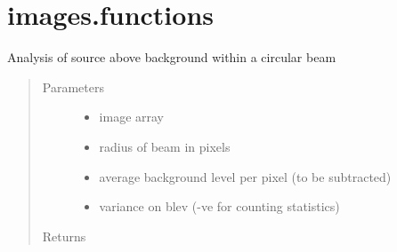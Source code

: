 \documentclass[letterpaper,10pt,english]{sphinxmanual}
\begin{document}
\section{images.functions}
\label{\detokenize{images_functions:module-images}}\label{\detokenize{images_functions:images-functions}}\label{\detokenize{images_functions::doc}}

\begin{fulllineitems}
\label{\detokenize{images_functions:images.beam}}
Analysis of source above background within a circular beam
\begin{quote}\begin{description}
\item[{Parameters}] \leavevmode\begin{itemize}
\item {} 
 \textendash{} image array

\item {} 
 \textendash{} radius of beam in pixels

\item {} 
 \textendash{} average background level per pixel (to be subtracted)

\item {} 
 \textendash{} variance on blev (-ve for counting statistics)

\end{itemize}

\item[{Returns}] \leavevmode


\end{description}
\end{quote}
\end{fulllineitems}
\end{document}
